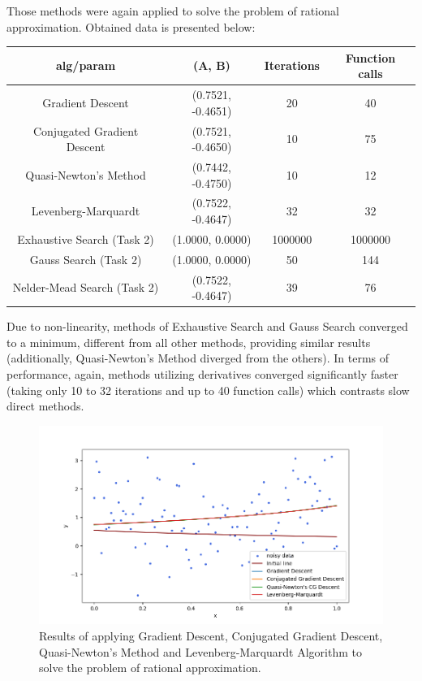 \documentclass[12pt, a4paper]{article}
\begin{document}
\newpage

Those methods were again applied to solve the problem of rational approximation. Obtained data is presented below:
\begin{center}
\begin{tabular}{cccc}
\hline
alg/param                   & (A, B)            & Iterations & Function calls \\ \hline
Gradient Descent            & (0.7521, -0.4651) & 20         & 40             \\
Conjugated Gradient Descent & (0.7521, -0.4650) & 10         & 75             \\
Quasi-Newton's Method       & (0.7442, -0.4750) & 10         & 12             \\
Levenberg-Marquardt         & (0.7522, -0.4647) & 32         & 32             \\ \hline
Exhaustive Search (Task 2)  & (1.0000, 0.0000)  & 1000000    & 1000000        \\
Gauss Search (Task 2)       & (1.0000, 0.0000)  & 50         & 144            \\
Nelder-Mead Search (Task 2) & (0.7522, -0.4647) & 39         & 76             \\ \hline
\end{tabular}
\end{center}
Due to non-linearity, methods of Exhaustive Search and Gauss Search converged to a minimum, different from all other methods, providing similar results (additionally, Quasi-Newton's Method diverged from the others). In terms of performance, again, methods utilizing derivatives converged significantly faster (taking only 10 to 32 iterations and up to 40 function calls) which contrasts slow direct methods.

\begin{figure}[!h]
\centering
\includegraphics[width=\textwidth]{rational.png}
\caption{Results of applying Gradient Descent, Conjugated Gradient Descent, Quasi-Newton's Method and Levenberg-Marquardt Algorithm to solve the problem of rational approximation.}
\end{figure}
\end{document}
